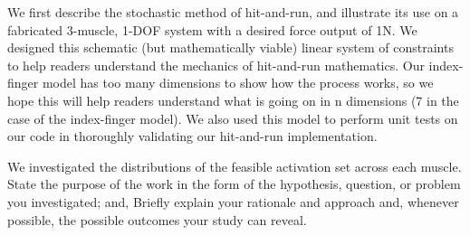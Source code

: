 We first describe the stochastic method of hit-and-run, and illustrate its use on a fabricated 3-muscle, 1-DOF system with a desired force output of 1N. We designed this schematic (but mathematically viable) linear system of constraints to help readers understand the mechanics of hit-and-run mathematics. Our index-finger model has too many dimensions to show how the process works, so we hope this will help readers understand what is going on in n dimensions (7 in the case of the index-finger model). We also used this model to perform unit tests on our code in thoroughly validating our hit-and-run implementation.

We investigated the distributions of the feasible activation set across each muscle.
State the purpose of the work in the form of the hypothesis, question, or problem you investigated; and,
Briefly explain your rationale and approach and, whenever possible, the possible outcomes your study can reveal.
